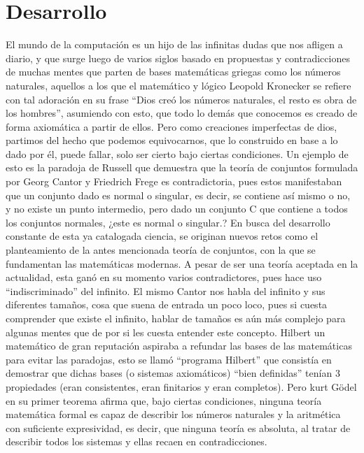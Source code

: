 \documentclass{article}
\begin{document}
\section*{Desarrollo}
El mundo de la computación es un hijo de las infinitas dudas que nos afligen a diario, y que surge luego de varios siglos basado en propuestas y contradicciones de muchas mentes que parten de bases matemáticas griegas como los números naturales, aquellos a los que el matemático y lógico Leopold Kronecker se refiere con tal adoración en su frase “Dios creó los números naturales, el resto es obra de los hombres”, asumiendo con esto, que todo lo demás que conocemos es creado de forma axiomática a partir de ellos. Pero como creaciones imperfectas de dios, partimos del hecho que podemos equivocarnos, que lo construido en base a lo dado por él, puede fallar, solo ser cierto bajo ciertas condiciones. Un ejemplo de esto es la paradoja de Russell que demuestra que la teoría de conjuntos formulada por Georg Cantor y Friedrich Frege es contradictoria, pues estos manifestaban que un conjunto dado es normal o singular, es decir, se contiene así mismo o no, y no existe un punto intermedio, pero dado un conjunto C que contiene a todos los conjuntos normales, ¿este es normal o singular.? 
En busca del desarrollo constante de esta ya catalogada ciencia, se originan nuevos retos como el planteamiento de la antes mencionada teoría de conjuntos, con la que se fundamentan las matemáticas modernas. A pesar de ser una teoría aceptada en la actualidad, esta ganó en su momento varios contradictores, pues hace uso “indiscriminado” del infinito. El mismo Cantor nos habla del infinito y sus diferentes tamaños, cosa que suena de entrada un poco loco, pues si cuesta comprender que existe el infinito, hablar de tamaños es aún más complejo para algunas mentes que de por si les cuesta entender este concepto. Hilbert un matemático de gran reputación aspiraba a refundar las bases de las matemáticas para evitar las paradojas, esto se llamó “programa Hilbert” que consistía en demostrar que dichas bases (o sistemas axiomáticos) “bien definidas” tenían 3 propiedades (eran consistentes, eran finitarios y eran completos). Pero kurt Gödel en su primer teorema afirma que, bajo ciertas condiciones, ninguna teoría matemática formal es capaz de describir los números naturales y la aritmética con suficiente expresividad, es decir, que ninguna teoría es absoluta, al tratar de describir todos los sistemas y ellas recaen en contradicciones. 
\end{document}
